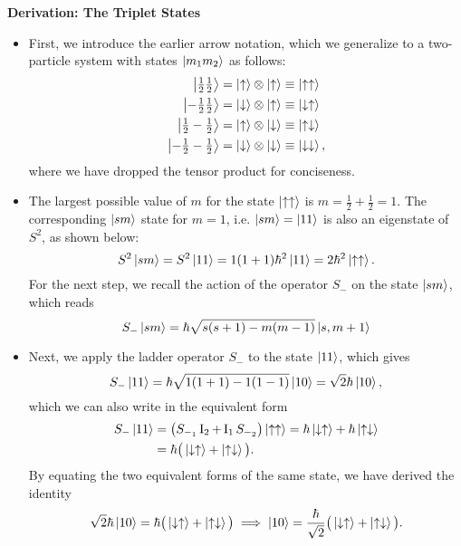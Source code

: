 \documentclass[11pt, a4paper]{article}
\newcommand{\ua}{\uparrow}  %
\newcommand{\da}{\downarrow}  %
\newcommand{\II}{\operatorname{I}}  %
\begin{document}
\textbf{Derivation: The Triplet States}
\begin{itemize}
    \item First, we introduce the earlier arrow notation, which we generalize to a two-particle system with states $ \ket{m_{1}m_{2}}  $ as follows:
    \begin{align*}
        \ket{\tfrac{1}{2}\tfrac{1}{2}} &= \ket{\ua} \otimes \ket{\ua} \equiv \ket{\ua\ua}\\
        \ket{-\tfrac{1}{2}\tfrac{1}{2}} &= \ket{\da} \otimes \ket{\ua} \equiv \ket{\da\ua}\\
        \ket{\tfrac{1}{2}-\tfrac{1}{2}} &= \ket{\ua} \otimes \ket{\da} \equiv \ket{\ua\da}\\
        \ket{-\tfrac{1}{2}-\tfrac{1}{2}} &= \ket{\da} \otimes \ket{\da} \equiv \ket{\da\da},
    \end{align*}
    where we have dropped the tensor product for conciseness.

    \item The largest possible value of $ m $ for the state $ \ket{\ua \ua} $ is $ m = \tfrac{1}{2} + \tfrac{1}{2} = 1 $. The corresponding $ \ket{sm} $ state for $ m = 1 $, i.e. $ \ket{sm} = \ket{11} $ is also an eigenstate of $ S^{2} $, as shown below:
    \begin{equation*}
        S^{2}\ket{sm} = S^{2}\ket{11} = 1(1 + 1)\hbar^{2}\ket{11} = 2\hbar^{2}\ket{\ua\ua}.
    \end{equation*}
    For the next step, we recall the action of the operator $ S_{-} $ on the state $ \ket{sm} $, which reads
    \begin{equation*}
        S_{-} \ket{sm} = \hbar \sqrt{s(s + 1) - m(m - 1) } \ket{s, m + 1}
    \end{equation*}
    
    \item Next, we apply the ladder operator $ S_{-} $ to the state $ \ket{11} $, which gives
    \begin{equation*}
        S_{-}\ket{11} = \hbar \sqrt{1(1+1) - 1(1-1)} \ket{10} = \sqrt{2}\hbar \ket{10},
    \end{equation*}
    which we can also write in the equivalent form
    \begin{align*}
        S_{-}\ket{11} & = \big( S_{-_{1}}\II_{2} + \II_{1} S_{-_{2}} \big)\ket{\ua\ua} = \hbar \ket{\da\ua} + \hbar \ket{\ua\da}\\
        &= \hbar \big( \ket{\da\ua} + \ket{\ua\da} \big).
    \end{align*}
    By equating the two equivalent forms of the same state, we have derived the identity
    \begin{equation*}
        \sqrt{2}\hbar \ket{10} = \hbar \big( \ket{\da\ua} + \ket{\ua\da} \big) \implies \ket{10} = \frac{\hbar}{\sqrt{2}} \big( \ket{\da\ua} + \ket{\ua\da} \big).
    \end{equation*}
    

\end{itemize}
\end{document}
